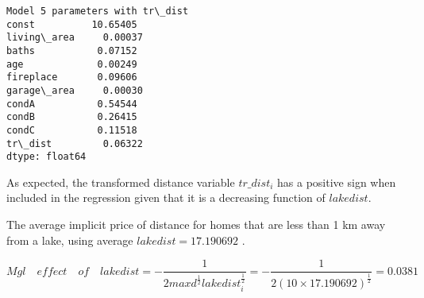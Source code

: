 \documentclass[11pt]{article}
\begin{document}
    \begin{Verbatim}[commandchars=\\\{\}]
Model 5 parameters with tr\_dist
const          10.65405
living\_area     0.00037
baths           0.07152
age             0.00249
fireplace       0.09606
garage\_area     0.00030
condA           0.54544
condB           0.26415
condC           0.11518
tr\_dist         0.06322
dtype: float64

    \end{Verbatim}

    As expected, the transformed distance variable \(tr\_dist_i\) has a
positive sign when included in the regression given that it is a
decreasing function of \(lakedist\).

The average implicit price of distance for homes that are less than 1 km
away from a lake, using average \(lakedist =17.190692\) .

\begin{equation}
Mgl \quad effect \quad  of \quad lakedist = - \frac{1}{2 maxd ^{\frac{1}{2}} lakedist_i ^{\frac{1}{2}}} = - \frac{1}{2 (10 \times 17.190692) ^{\frac{1}{2}}} = 0.0381
\end{equation}


    
    
    
    
\end{document}
